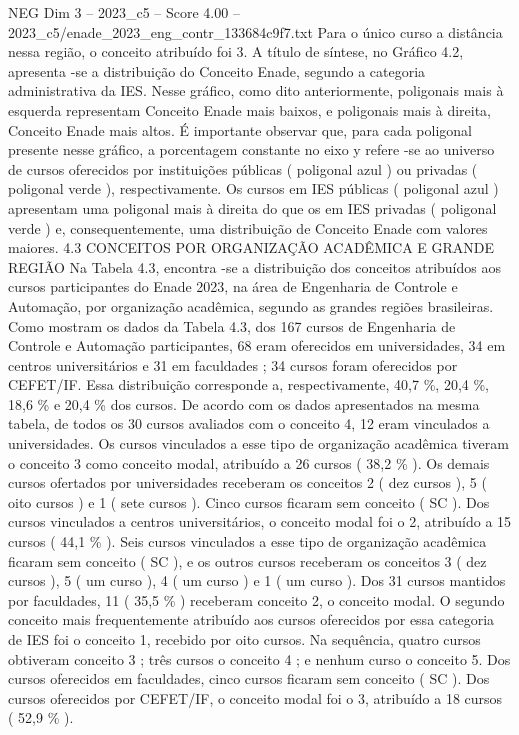 \begin{textsample}{NEG Dim 3 – 2023\_c5 – Score 4.00 – 2023\_c5/enade\_2023\_eng\_contr\_133684c9f7.txt}
Para o único curso a distância nessa região, o conceito atribuído foi 3.
A título de síntese, no Gráfico 4.2, apresenta -se a distribuição do Conceito Enade, segundo a categoria administrativa da IES.
Nesse gráfico, como dito anteriormente, poligonais mais à esquerda representam Conceito Enade mais baixos, e poligonais mais à direita, Conceito Enade mais altos.
É importante observar que, para cada poligonal presente nesse gráfico, a porcentagem constante no eixo y refere -se ao universo de cursos oferecidos por instituições públicas ( poligonal azul ) ou privadas ( poligonal verde ), respectivamente.
Os cursos em IES públicas ( poligonal azul ) apresentam uma poligonal mais à direita do que os em IES privadas ( poligonal verde ) e, consequentemente, uma distribuição de Conceito Enade com valores maiores. 4.3 CONCEITOS POR ORGANIZAÇÃO ACADÊMICA E GRANDE REGIÃO Na Tabela 4.3, encontra -se a distribuição dos conceitos atribuídos aos cursos participantes do Enade 2023, na área de Engenharia de Controle e Automação, por organização acadêmica, segundo as grandes regiões brasileiras.
Como mostram os dados da Tabela 4.3, dos 167 cursos de Engenharia de Controle e Automação participantes, 68 eram oferecidos em universidades, 34 em centros universitários e 31 em faculdades ; 34 cursos foram oferecidos por CEFET/IF.
Essa distribuição corresponde a, respectivamente, 40,7 \%, 20,4 \%, 18,6 \% e 20,4 \% dos cursos.
De acordo com os dados apresentados na mesma tabela, de todos os 30 cursos avaliados com o conceito 4, 12 eram vinculados a universidades.
Os cursos vinculados a esse tipo de organização acadêmica tiveram o conceito 3 como conceito modal, atribuído a 26 cursos ( 38,2 \% ).
Os demais cursos ofertados por universidades receberam os conceitos 2 ( dez cursos ), 5 ( oito cursos ) e 1 ( sete cursos ).
Cinco cursos ficaram sem conceito ( SC ).
Dos cursos vinculados a centros universitários, o conceito modal foi o 2, atribuído a 15 cursos ( 44,1 \% ).
Seis cursos vinculados a esse tipo de organização acadêmica ficaram sem conceito ( SC ), e os outros cursos receberam os conceitos 3 ( dez cursos ), 5 ( um curso ), 4 ( um curso ) e 1 ( um curso ).
Dos 31 cursos mantidos por faculdades, 11 ( 35,5 \% ) receberam conceito 2, o conceito modal.
O segundo conceito mais frequentemente atribuído aos cursos oferecidos por essa categoria de IES foi o conceito 1, recebido por oito cursos.
Na sequência, quatro cursos obtiveram conceito 3 ; três cursos o conceito 4 ; e nenhum curso o conceito 5.
Dos cursos oferecidos em faculdades, cinco cursos ficaram sem conceito ( SC ).
Dos cursos oferecidos por CEFET/IF, o conceito modal foi o 3, atribuído a 18 cursos ( 52,9 \% ).

\end{textsample}

